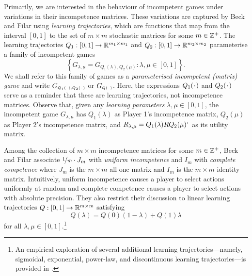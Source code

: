     Primarily, we are interested in the behaviour of incompetent games under variations in their incompetence matrices.
    These variations are captured by Beck and Filar \parencite{Beck2007} using \emph{learning trajectories}, which are functions that map from the interval $[0, 1]$ to the set of $m \times m$ stochastic matrices for some $m \in \mathbb{Z}^+$.
    The learning trajectories $Q_1 : [0, 1] \to \mathbb{R}^{m_1 \times m_1}$ and $Q_2 : [0, 1] \to \mathbb{R}^{m_2 \times m_2}$ parameterise a family of incompetent games
    \[
        \left\{
            G_{\lambda, \mu}
                = G_{Q_1(\lambda), Q_2(\mu)}
                : \lambda, \mu \in [0, 1]
        \right\}.
    \]
    We shall refer to this family of games as a \emph{parameterised incompetent (matrix) game} and write $G_\ms{Q_1(\funcdot), Q_2(\funcdot)}$ or $G_\ms{Q(\funcdot)}$.
    Here, the expressions $Q_1(\funcdot)$ and $Q_2(\funcdot)$ serve as a reminder that these are learning trajectories, not incompetence matrices.
    Observe that, given any \emph{learning parameters} $\lambda, \mu \in [0, 1]$, the incompetent game $G_{\lambda, \mu}$ has $Q_1(\lambda)$ as Player 1's incompetence matrix, $Q_2(\mu)$ as Player 2's incompetence matrix, and $R_{\lambda, \mu} = Q_1(\lambda) R Q_2(\mu)^{\scriptscriptstyle \mathsf{T}}$ as its utility matrix.

    Among the collection of $m \times m$ incompetence matrices for some $m \in \mathbb{Z}^+$, Beck and Filar \parencite{Beck2007} associate $\nicefrac{1}{m} \cdot J_m$ with \emph{uniform incompetence} and $I_m$ with \emph{complete competence} where $J_m$ is the $m \times m$ all-one matrix and $I_m$ is the $m \times m$ identity matrix.
    Intuitively, uniform incompetence causes a player to select actions uniformly at random and complete competence causes a player to select actions with absolute precision.
    They also restrict their discussion to linear learning trajectories $Q : [0, 1] \to \mathbb{R}^{m \times m}$ satisfying
    \[
        Q(\lambda)
            = Q(0) (1 - \lambda) + Q(1) \lambda
    \]
    for all $\lambda, \mu \in [0, 1]$.\footnote{An
        empirical exploration of several additional learning trajectories---namely, sigmoidal, exponential, power-law, and discontinuous learning trajectories---is provided in \parencite[Section 4.4]{Beck2013}.
    }

